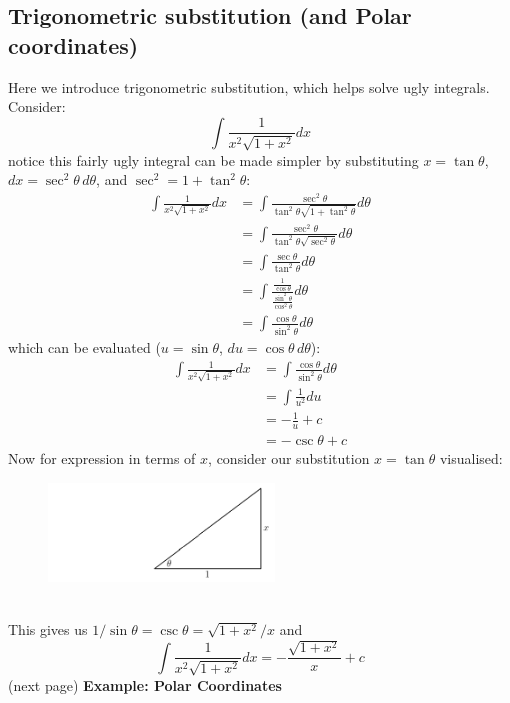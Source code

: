 \documentclass{report}
\begin{document}
\subsection{Trigonometric substitution (and Polar coordinates)} %
Here we introduce trigonometric substitution, which helps solve ugly integrals. Consider:
\begin{equation*}
\int\frac{1}{x^2\sqrt{1+x^2}}dx
\end{equation*}
notice this fairly ugly integral can be made simpler by substituting 
$x=\tan\theta$, $dx=\sec^2\theta\,d\theta$, and $\sec^2=1+\tan^2\theta$:
\begin{align*}
\int\frac{1}{x^2\sqrt{1+x^2}}dx
&=\int\frac{\sec^2\theta}{\tan^2\theta\sqrt{1+\tan^2\theta}}d\theta\\
&=\int\frac{\sec^2\theta}{\tan^2\theta\sqrt{\sec^2\theta}}d\theta\\
&=\int\frac{\sec\theta}{\tan^2\theta}d\theta\\
&=\int\frac{\frac{1}{\cos\theta}}{\frac{\sin^2\theta}{\cos^2\theta}}d\theta\\
&=\int\frac{\cos\theta}{\sin^2\theta}d\theta
\end{align*}
which can be evaluated ($u=\sin\theta$, $du=\cos\theta\,d\theta$):
\begin{align*}
\int\frac{1}{x^2\sqrt{1+x^2}}dx&=\int\frac{\cos\theta}{\sin^2\theta}d\theta\\
&=\int\frac{1}{u^2}du\\
&=-\frac{1}{u}+c\\
&=-\csc\theta+c
\end{align*}
Now for expression in terms of $x$, consider our substitution
$x=\tan\theta$ visualised:
\begin{figure}[h]
\includegraphics[width=6cm]{Capture44}\\
\centering
{}
\end{figure}\\
This gives us $1/\sin\theta=\csc\theta=\sqrt{1+x^2}/x$ and
\begin{equation*}
\int\frac{1}{x^2\sqrt{1+x^2}}dx=-\frac{\sqrt{1+x^2}}{x}+c
\end{equation*}
(next page)
\newpage
\noindent\textbf{Example: Polar Coordinates}\\
\end{document}

